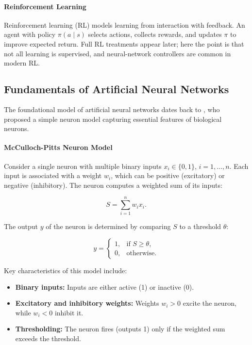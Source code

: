 \paragraph{Reinforcement Learning}
Reinforcement learning (RL) models learning from interaction with feedback. An agent with policy \(\pi(a\mid s)\) selects actions, collects rewards, and updates \(\pi\) to improve expected return. Full RL treatments appear later; here the point is that not all learning is supervised, and neural-network controllers are common in modern RL.

\subsection{Fundamentals of Artificial Neural Networks}
\label{sec:perceptron_fundamentals_of_artificial_neural_networks}

The foundational model of artificial neural networks dates back to \citet{McCullochPitts1943}, who proposed a simple neuron model capturing essential features of biological neurons.

\paragraph{McCulloch-Pitts Neuron Model}

Consider a single neuron with multiple binary inputs \( x_i \in \{0,1\} \), \( i=1, \ldots, n \). Each input is associated with a weight \( w_i \), which can be positive (excitatory) or negative (inhibitory). The neuron computes a weighted sum of its inputs:

\begin{equation}
    S = \sum_{i=1}^n w_i x_i.
    \label{eq:weighted_sum}
\end{equation}

The output \( y \) of the neuron is determined by comparing \( S \) to a threshold \(\theta\):

\begin{equation}
    y =
    \begin{cases}
        1, & \text{if } S \geq \theta, \\
        0, & \text{otherwise}.
    \end{cases}
    \label{eq:threshold_output}
\end{equation}

Key characteristics of this model include:

\begin{itemize}
    \item \textbf{Binary inputs:} Inputs are either active (1) or inactive (0).
    \item \textbf{Excitatory and inhibitory weights:} Weights \( w_i > 0 \) excite the neuron, while \( w_i < 0 \) inhibit it.
    \item \textbf{Thresholding:} The neuron fires (outputs 1) only if the weighted sum exceeds the threshold.
\end{itemize}

